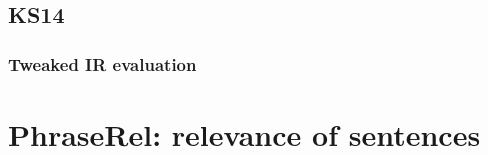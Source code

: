 \subsection{KS14}
\label{sec:ks14}

\subsubsection{Tweaked IR evaluation}
\label{sec:tweak-ir-eval}


\section{PhraseRel: relevance of sentences}
\label{sec:sentential-relevance}

